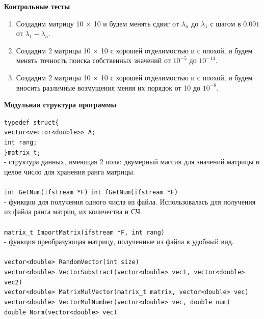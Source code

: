 \documentclass{article}
\begin{document}
	\begin{center} \textbf{Контрольные тесты}\end{center}
	\begin{enumerate}
		\item Создадим матрицу 10 $\times$ 10 и будем менять сдвиг от $\lambda_n$ до $\lambda_1$ с шагом в $0.001$ от $\lambda_1 - \lambda_n$.
		\item Создадим 2 матрицы 10 $\times$ 10 с хорошей отделимостью и с плохой, и будем менять точность поиска собственных значений от $10^{-5}$ до $10^{-14}$.
		\item Создадим 2 матрицы 10 $\times$ 10 с хорошей отделимостью и с плохой, и будем вносить различные возмущения меняя их порядок от 10 до $10^{-8}$.
	\end{enumerate}
	\newpage
	\begin{center} \textbf{Модульная структура программы}\end{center}
	\verb|typedef struct{|\\
		\hspace*{1cm} \verb|vector<vector<double>> A;|\\
		\hspace*{1cm} \verb|int rang;|\\
		\verb|}matrix_t;|\\
	- структура данных, имеющая 2 поля: двумерный массив для значений матрицы и целое число для хранения ранга матрицы.\\
	\\
	\verb|int GetNum(ifstream *F)|
	\verb|int fGetNum(ifstream *F)|\\
	- функции для получения одного числа из файла. Использовалась для получения из файла ранга матриц, их количества и СЧ.\\
	\\
	\verb|matrix_t ImportMatrix(ifstream *F, int rang)|\\
	- функция преобразующая матрицу, полученные из файла в удобный вид.\\
	\\
	\verb|vector<double> RandomVector(int size)|\\
	\verb|vector<double> VectorSubstract(vector<double> vec1, vector<double> vec2)|\\
	\verb|vector<double> MatrixMulVector(matrix_t matrix, vector<double> vec)|\\
	\verb|vector<double> VectorMulNumber(vector<double> vec, double num)|\\
	\verb|double Norm(vector<double> vec)|\\
\end{document}
